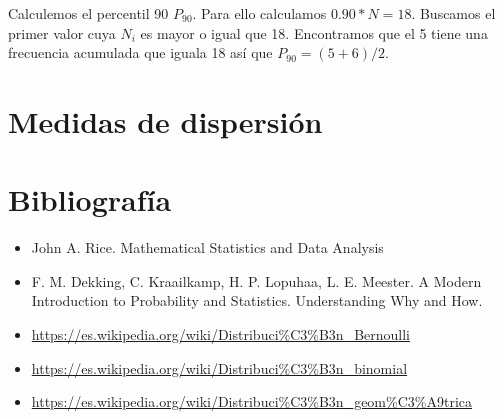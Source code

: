 \documentclass[
]{article}
\providecommand{\tightlist}{%
  \setlength{\itemsep}{0pt}\setlength{\parskip}{0pt}}
\begin{document}
Calculemos el percentil 90 \(P_{90}\). Para ello calculamos
\(0.90*N = 18\). Buscamos el primer valor cuya \(N_i\) es mayor o igual
que 18. Encontramos que el 5 tiene una frecuencia acumulada que iguala
18 así que \(P_{90} = (5+6)/2\).

\hypertarget{medidas-de-dispersiuxf3n}{%
\section{Medidas de dispersión}\label{medidas-de-dispersiuxf3n}}

\hypertarget{bibliografuxeda}{%
\section{Bibliografía}\label{bibliografuxeda}}

\begin{itemize}
\tightlist
\item
  John A. Rice. Mathematical Statistics and Data Analysis
\item
  F. M. Dekking, C. Kraailkamp, H. P. Lopuhaa, L. E. Meester. A Modern
  Introduction to Probability and Statistics. Understanding Why and How.
\item
  \url{https://es.wikipedia.org/wiki/Distribuci\%C3\%B3n_Bernoulli}
\item
  \url{https://es.wikipedia.org/wiki/Distribuci\%C3\%B3n_binomial}
\item
  \url{https://es.wikipedia.org/wiki/Distribuci\%C3\%B3n_geom\%C3\%A9trica}
\end{itemize}
\end{document}
